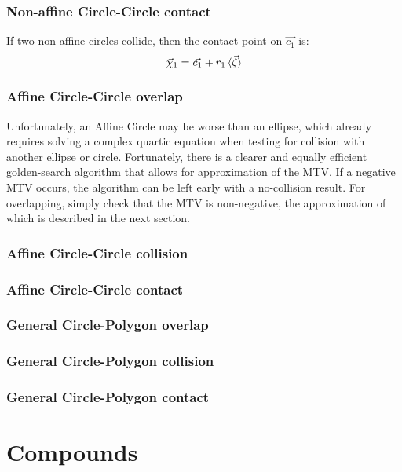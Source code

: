 \documentclass[10pt]{report}
\begin{document}
\subsubsection{Non-affine Circle-Circle contact}
If two non-affine circles collide, then the contact point on $\vec{c_1}$ is:
\begin{equation}\vec{\chi}_1=\vec{c_1}+r_1\braket{\vec{\zeta}}\end{equation}

\subsubsection{Affine Circle-Circle overlap}
Unfortunately, an Affine Circle may be worse than an ellipse, which already requires solving a complex quartic equation when testing for collision with another ellipse or circle. Fortunately, there is a clearer and equally efficient golden-search algorithm that allows for approximation of the MTV. If a negative MTV occurs, the algorithm can be left early with a no-collision result. For overlapping, simply check that the MTV is non-negative, the approximation of which is described in the next section.

\subsubsection{Affine Circle-Circle collision}

\subsubsection{Affine Circle-Circle contact}

\subsubsection{General Circle-Polygon overlap}

\subsubsection{General Circle-Polygon collision}

\subsubsection{General Circle-Polygon contact}

\section{Compounds}
\end{document}
